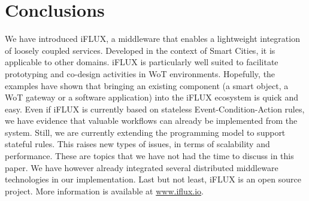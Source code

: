 \section{Conclusions}

We have introduced iFLUX, a middleware that enables a lightweight integration of loosely coupled services. Developed in the context of Smart Cities, it is applicable to other domains. iFLUX is particularly well suited to facilitate prototyping and co-design activities in WoT environments. Hopefully, the examples have shown that bringing an existing component (a smart object, a WoT gateway or a software application) into the iFLUX ecosystem is quick and easy. Even if iFLUX is currently based on stateless Event-Condition-Action rules, we have evidence that valuable workflows can already be implemented from the system. Still, we are currently extending the programming model to support stateful rules. This raises new types of issues, in terms of scalability and performance. These are topics that we have not had the time to discuss in this paper. We have however already integrated several distributed middleware technologies in our implementation. Last but not least, iFLUX is an open source project. More information is available at \url{www.iflux.io}.
